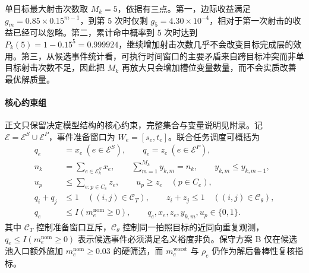 \documentclass{cumcmthesis}
\begin{document}
单目标最大射击次数取 $M_k=5$，依据有三点。第一，边际收益满足 $g_m=0.85\times0.15^{m-1}$，到第 5 次时仅剩 $g_5=4.30\times10^{-4}$，相对于第一次射击的收益已经可以忽略。第二，累计命中概率到 5 次时达到 $P_k(5)=1-0.15^5=0.999924$，继续增加射击次数几乎不会改变目标完成层的效用。第三，从候选事件统计看，可执行时间窗口的主要矛盾来自跨目标冲突而非单目标射击次数不足，因此把 $M_k$ 再放大只会增加槽位变量数量，而不会实质改善最优解质量。

\paragraph{核心约束组}
正文只保留决定模型结构的核心约束，完整集合与变量说明见附录。记 $\mathcal E=\mathcal E^S\cup\mathcal E^P$，事件准备窗口为 $W_e=[s_e,t_e]$。联合任务调度可概括为
\begin{align}
  q_e&=x_e\ (e\in\mathcal E^S),\qquad q_e=z_e\ (e\in\mathcal E^P),\\
  n_k&=\sum_{e\in\mathcal E^S_k}x_e,\qquad
  \sum_{m=1}^{M_k}y_{k,m}=n_k,\qquad y_{k,m}\le y_{k,m-1},\\
  u_p&\le\sum_{e:p\in C_e}z_e,\qquad u_p\ge z_e\quad(p\in C_e),\\
  q_i+q_j&\le1\quad((i,j)\in\mathcal C_T),\qquad
  z_i+z_j\le1\quad((i,j)\in\mathcal C_\theta),\\
  q_e&\le I(m_e^{\mathrm{nom}}\ge0),\qquad
  q_e,x_e,z_e,y_{k,m},u_p\in\{0,1\}.
\end{align}
其中 $\mathcal C_T$ 控制准备窗口互斥，$\mathcal C_\theta$ 控制同一拍照目标的近同向重复观测，$q_e\le I(m_e^{\mathrm{nom}}\ge0)$ 表示候选事件必须满足名义裕度非负。保守方案 B 仅在候选池入口额外施加 $m_e^{\mathrm{nom}}\ge0.03$ 的硬筛选，而 $m_e^{\mathrm{worst}}$ 与 $\rho_e$ 仍作为解后鲁棒性复核指标。
\end{document}
